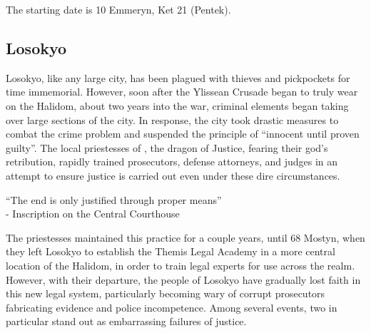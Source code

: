\documentclass[11pt]{article} %
\newcommand{\linkto}[1]{\textbf{\nameref{#1}}}
\begin{document}
The starting date is 10 Emmeryn, Ket 21 (Pentek).

\subsection{Losokyo}

Losokyo, like any large city, has been plagued with thieves and pickpockets for time immemorial. However, soon after the Ylissean Crusade began to truly wear on the Halidom, about two years into the war, criminal elements began taking over large sections of the city. In response, the city took drastic measures to combat the crime problem and suspended the principle of ``innocent until proven guilty''. The local priestesses of \linkto{religion:themis}, the dragon of Justice, fearing their god's retribution, rapidly trained prosecutors, defense attorneys, and judges in an attempt to ensure justice is carried out even under these dire circumstances.
\begin{center}
``The end is only justified through proper means'' \\
- Inscription on the Central Courthouse
\end{center}

The priestesses maintained this practice for a couple years, until 68 Mostyn, when they left Losokyo to establish the Themis Legal Academy in a more central location of the Halidom, in order to train legal experts for use across the realm. However, with their departure, the people of Losokyo have gradually lost faith in this new legal system, particularly becoming wary of corrupt prosecutors fabricating evidence and police incompetence. Among several events, two in particular stand out as embarrassing failures of justice.
\end{document}
